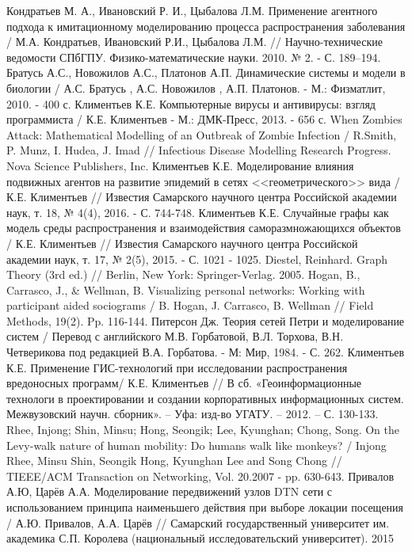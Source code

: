 \newpage
\parindent=1cm %

\begin{thebibliography}{}
	  Кондратьев М. А.,	Ивановский Р. И.,	Цыбалова Л.М. Применение агентного подхода к имитационному моделированию процесса распространения заболевания / М.А. Кондратьев, Ивановский Р.И., Цыбалова Л.М. // Научно-технические ведомости СПбГПУ. Физико-математические науки. 2010. № 2. - С. 189–194.
	 Братусь А.С., Новожилов А.С., Платонов А.П. Динамические системы и модели в биологии /   А.С. Братусь , А.С. Новожилов ,  А.П. Платонов. - М.: Физматлит, 2010. -  400 с.
	 Климентьев К.Е. Компьютерные вирусы и антивирусы: взгляд программиста / К.Е. Климентьев - М.: ДМК-Пресс, 2013. - 656 с.
	 When Zombies Attack: Mathematical Modelling of an Outbreak of Zombie Infection / R.Smith, P. Munz, I. Hudea, J. Imad // Infectious Disease Modelling Research Progress. Nova Science Publishers, Inc.
	 Климентьев К.Е. Моделирование влияния подвижных агентов на развитие эпидемий  в сетях <<геометрического>> вида / К.Е. Климентьев  // Известия Самарского научного центра Российской академии наук, т. 18, № 4(4), 2016. - С. 744-748.
	Климентьев К.Е. Случайные графы как модель среды распространения и взаимодействия саморазмножающихся объектов / К.Е. Климентьев  // Известия Самарского научного центра Российской академии наук, т. 17, № 2(5), 2015. - С. 1021 - 1025.
	 Diestel, Reinhard. Graph Theory (3rd ed.) // Berlin, New York: Springer-Verlag. 2005.
	 Hogan, B., Carrasco, J., \& Wellman, B. Visualizing personal networks: Working with participant aided sociograms / B. Hogan, J. Carrasco, B. Wellman // Field Methods, 19(2).  Pp. 116-144.
	Питерсон Дж. Теория сетей Петри и моделирование систем / Перевод с английского М.В. Горбатовой, В.Л. Торхова, В.Н. Четверикова под редакцией В.А. Горбатова. - М: Мир, 1984. - С. 262.
	 Климентьев К.Е. Применение ГИС-технологий при исследовании распространения
	вредоносных программ/ К.Е. Климентьев  // В сб. «Геоинформационные технологи в проектировании и создании корпоративных
	информационных систем. Межвузовский научн. сборник». – Уфа: изд-во УГАТУ. – 2012. – С. 130-133. 
	 Rhee, Injong; Shin, Minsu; Hong, Seongik; Lee, Kyunghan; Chong, Song. On the Levy-walk nature of human mobility: Do humans walk like monkeys? / Injong Rhee, Minsu Shin, Seongik Hong, Kyunghan Lee and Song Chong // TIEEE/ACM Transaction on Networking, Vol. 20.2007 - pp. 630-643.
	 Привалов А.Ю, Царёв А.А. Моделирование передвижений узлов DTN сети с использованием принципа наименьшего действия при выборе локации посещения / А.Ю. Привалов, А.А. Царёв // Самарский государственный университет им. академика С.П. Королева (национальный исследовательский университет). 2015
\end{thebibliography}